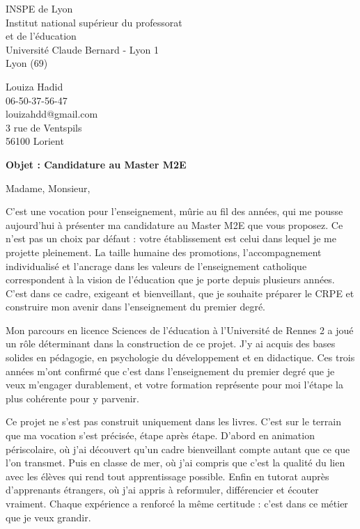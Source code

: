 \documentclass[12pt,a4paper]{letter}
\begin{document}
\begin{letter}{INSPE de Lyon\\
Institut national supérieur du professorat\\
et de l'éducation\\
Université Claude Bernard - Lyon 1\\
Lyon (69)}

\hspace{-2cm}
\begin{minipage}{0.45\textwidth}
Louiza Hadid\\
06-50-37-56-47\\
louizahdd@gmail.com\\
3 rue de Ventspils\\
56100 Lorient
\end{minipage}

\vspace{1cm}

\textbf{Objet : Candidature au Master M2E}

\opening{Madame, Monsieur,}

\hspace{1cm} C'est une vocation pour l'enseignement, mûrie au fil des années, qui me pousse aujourd'hui à présenter ma candidature au Master M2E que vous proposez. Ce n'est pas un choix par défaut : votre établissement est celui dans lequel je me projette pleinement. La taille humaine des promotions, l'accompagnement individualisé et l'ancrage dans les valeurs de l'enseignement catholique correspondent à la vision de l'éducation que je porte depuis plusieurs années. C'est dans ce cadre, exigeant et bienveillant, que je souhaite préparer le CRPE et construire mon avenir dans l'enseignement du premier degré.

\hspace{1cm} Mon parcours en licence Sciences de l'éducation à l'Université de Rennes 2 a joué un rôle déterminant dans la construction de ce projet. J'y ai acquis des bases solides en pédagogie, en psychologie du développement et en didactique. Ces trois années m'ont confirmé que c'est dans l'enseignement du premier degré que je veux m'engager durablement, et votre formation représente pour moi l'étape la plus cohérente pour y parvenir.

\hspace{1cm} Ce projet ne s'est pas construit uniquement dans les livres. C'est sur le terrain que ma vocation s'est précisée, étape après étape. D'abord en animation périscolaire, où j'ai découvert qu'un cadre bienveillant compte autant que ce que l'on transmet. Puis en classe de mer, où j'ai compris que c'est la qualité du lien avec les élèves qui rend tout apprentissage possible. Enfin en tutorat auprès d'apprenants étrangers, où j'ai appris à reformuler, différencier et écouter vraiment. Chaque expérience a renforcé la même certitude : c'est dans ce métier que je veux grandir.


\end{letter}
\end{document}
